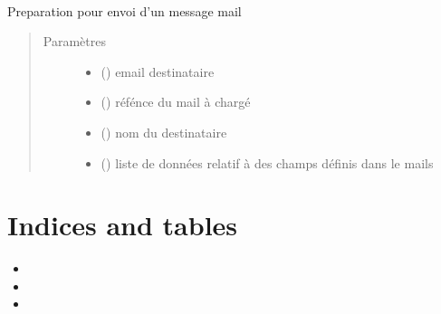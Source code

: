 \documentclass[letterpaper,10pt,french]{sphinxmanual}
\begin{document}
\begin{fulllineitems}
\label{\detokenize{classes/cfgloader:toolbox.mailbot.CMailer}}~

\begin{fulllineitems}
\label{\detokenize{classes/cfgloader:toolbox.mailbot.CMailer.presend}}
Preparation pour envoi d’un message mail
\begin{quote}\begin{description}
\item[{Paramètres}] \leavevmode\begin{itemize}
\item {} 
 () \textendash{} email destinataire

\item {} 
 () \textendash{} réfénce du mail à chargé

\item {} 
 () \textendash{} nom du destinataire

\item {} 
 () \textendash{} liste de données relatif à des champs définis dans le mails

\end{itemize}

\end{description}\end{quote}

\end{fulllineitems}


\end{fulllineitems}



\chapter{Indices and tables}
\label{\detokenize{index:indices-and-tables}}\begin{itemize}
\item {} 

\item {} 

\item {} 

\end{itemize}
\end{document}
